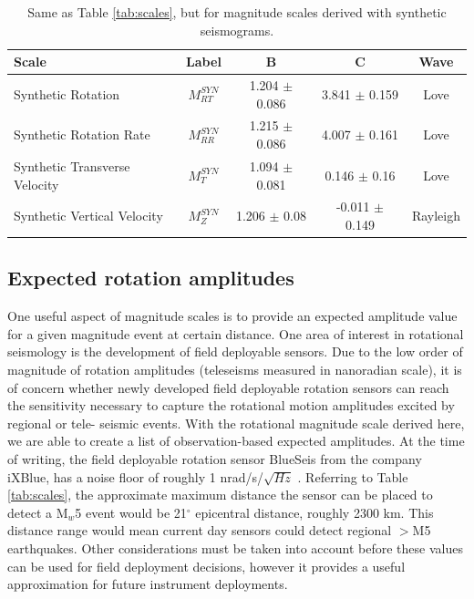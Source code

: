 \documentclass{gji}
\begin{document}
\begin{table}
\begin{minipage}{115mm}
	\begin{center}
		\begin{tabular}{ |l|c|c|c|c| } 
		        \bf{Scale} & \bf{Label} & \bf{B} & \bf{C}  & \bf{Wave}\\ \hline
        Synthetic Rotation  & $M^{SYN}_{RT}$ & 1.204 $\pm$ 0.086 & 3.841 $\pm$ 0.159  & Love \\ \hline
	Synthetic Rotation Rate & $M^{SYN}_{RR}$ & 1.215 $\pm$ 0.086 & 4.007 $\pm$ 0.161  & Love\\ \hline 
        Synthetic Transverse Velocity & $M^{SYN}_T$ & 1.094 $\pm$ 0.081 & 0.146 $\pm$ 0.16 & Love \\ \hline
        Synthetic Vertical Velocity  & $M^{SYN}_Z$ & 1.206 $\pm$ 0.08 & -0.011 $\pm$ 0.149  & Rayleigh \\ \hline
		\end{tabular}
		
    		\caption{Same as Table \ref{tab:scales}, but for magnitude scales derived with synthetic seismograms.}
		\label{tab:syn_scales}
	\end{center}
	\end{minipage}
\end{table}


\subsection{Expected rotation amplitudes}
One useful aspect of magnitude scales is to provide an expected amplitude value for a given magnitude event at certain distance. One area of interest in rotational seismology is the development of field deployable sensors. Due to the low order of magnitude of rotation amplitudes (teleseisms measured in nanoradian scale), it is of concern whether newly developed field deployable rotation sensors can reach the sensitivity necessary to capture the rotational motion amplitudes excited by regional or tele- seismic events. With the rotational magnitude scale derived here, we are able to create a list of observation-based expected amplitudes. At the time of writing, the field deployable rotation sensor BlueSeis from the company iXBlue, has a noise floor of roughly 1 nrad/s/$\sqrt{Hz}$ \cite{bernauer2018blueseis3a}. Referring to Table \ref{tab:scales}, the approximate maximum distance the sensor can be placed to detect a M$_w$5 event would be 21$^\circ$ epicentral distance, roughly 2300 km. This distance range would mean current day sensors could detect regional $>$M5 earthquakes. Other considerations must be taken into account before these values can be used for field deployment decisions, however it provides a useful approximation for future instrument deployments.
\end{document}
